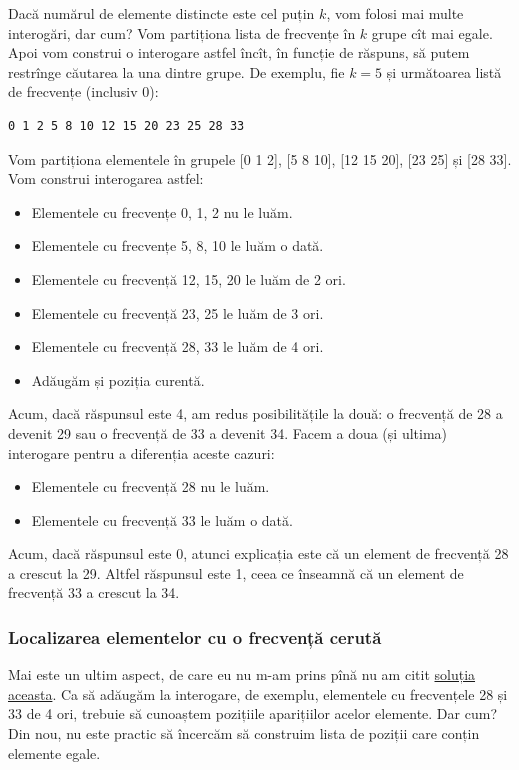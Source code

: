 \documentclass[../main.tex]{subfiles}
\begin{document}
Dacă numărul de elemente distincte este cel puțin $k$, vom folosi mai multe interogări, dar cum? Vom partiționa lista de frecvențe în $k$ grupe cît mai egale. Apoi vom construi o interogare astfel încît, în funcție de răspuns, să putem restrînge căutarea la una dintre grupe. De exemplu, fie $k=5$ și următoarea listă de frecvențe (inclusiv 0):

\begin{verbatim}
0 1 2 5 8 10 12 15 20 23 25 28 33
\end{verbatim}

Vom partiționa elementele în grupele [0 1 2], [5 8 10], [12 15 20], [23 25] și [28 33]. Vom construi interogarea astfel:

\begin{itemize}
  \item Elementele cu frecvențe 0, 1, 2 nu le luăm.
  \item Elementele cu frecvențe 5, 8, 10 le luăm o dată.
  \item Elementele cu frecvență 12, 15, 20 le luăm de 2 ori.
  \item Elementele cu frecvență 23, 25 le luăm de 3 ori.
  \item Elementele cu frecvență 28, 33 le luăm de 4 ori.
  \item Adăugăm și poziția curentă.
\end{itemize}

Acum, dacă răspunsul este 4, am redus posibilitățile la două: o frecvență de 28 a devenit 29 sau o frecvență de 33 a devenit 34. Facem a doua (și ultima) interogare pentru a diferenția aceste cazuri:

\begin{itemize}
  \item Elementele cu frecvență 28 nu le luăm.
  \item Elementele cu frecvență 33 le luăm o dată.
\end{itemize}

Acum, dacă răspunsul este 0, atunci explicația este că un element de frecvență 28 a crescut la 29. Altfel răspunsul este 1, ceea ce înseamnă că un element de frecvență 33 a crescut la 34.

\subsubsection*{Localizarea elementelor cu o frecvență cerută}

Mai este un ultim aspect, de care eu nu m-am prins pînă nu am citit \href{https://kilonova.ro/submissions/761967}{soluția aceasta}. Ca să adăugăm la interogare, de exemplu, elementele cu frecvențele 28 și 33 de 4 ori, trebuie să cunoaștem pozițiile aparițiilor acelor elemente. Dar cum? Din nou, nu este practic să încercăm să construim lista de poziții care conțin elemente egale.
\end{document}
